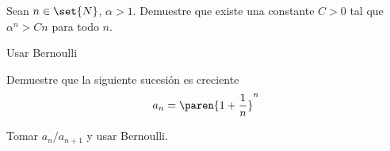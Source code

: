 \documentclass{ayudantia}
\begin{document}
\begin{prob}
    Sean \(n\in\set{N}\), \(\alpha>1\). Demuestre que existe una constante \(C>0\) tal que \(\alpha^n>Cn\) para todo \(n\).
\end{prob}

\begin{ans}
    \begin{sol}
        Usar Bernoulli
    \end{sol}
\end{ans}


\begin{prob}
    Demuestre que la siguiente sucesión es creciente
    \begin{equation*}
        a_n=\paren{1+\frac1n}^n
    \end{equation*}
\end{prob}

\begin{ans}
    \begin{sol}
        Tomar \(a_n/a_{n+1}\) y usar Bernoulli.
    \end{sol}
\end{ans}
\end{document}
